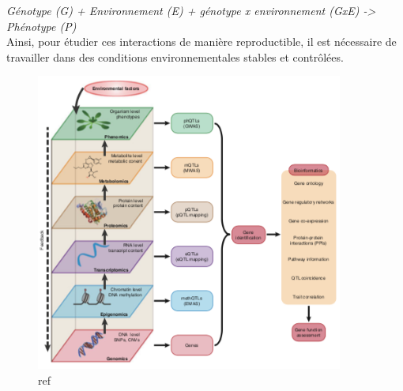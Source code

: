  \textit{Génotype (G) + Environnement (E) +  génotype x environnement (GxE) -> Phénotype (P)}\\
 Ainsi, pour étudier ces interactions de manière reproductible, il est nécessaire de travailler dans des conditions environnementales stables et contrôlées. 
 \\
 
\begin{figure}[!ht]
    \centering
    \includegraphics[width=0.9\textwidth]{hdr_manuscript/Figures/Geno-pheno.png}
    \caption{ref\cite{ChenCAK14}}
    \label{fig:geno-pheno}
\end{figure}


